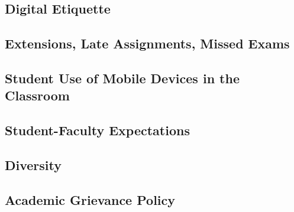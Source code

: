 \documentclass[letterpaper,oneside,10pt]{scrartcl}
\begin{document}
    \subsection{Digital Etiquette}
        
        
    \subsection{Extensions, Late Assignments, Missed Exams}
        

    \subsection{Student Use of Mobile Devices in the Classroom}
        
        
    \subsection{Student-Faculty Expectations}
        
        
    \subsection{Diversity}
        
        
    \subsection{Academic Grievance Policy}
        
\end{document}
